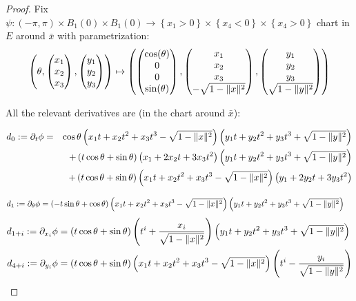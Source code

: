 \documentclass[9pt]{article}
\begin{document}
\begin{proof}
  Fix $\psi: \left(-\pi, \pi \right)\times B_1(0) \times B_1(0)\rightarrow \left\{ x_1 > 0\right\}\times \left\{ x_4 <0\right\}\times \left\{ x_4 >0\right\}$ chart in $E$ around $\bar{x}$ with parametrization:
  \[
    \left(\theta, \begin{pmatrix}x_1\\ x_2 \\ x_3\end{pmatrix},\begin{pmatrix}y_1\\y_2\\y_3\end{pmatrix}\right) \mapsto \left(\begin{pmatrix}\cos(\theta)\\ 0\\ 0\\ \sin(\theta)\end{pmatrix}, \begin{pmatrix}x_1\\ x_2 \\ x_3\\-\sqrt{1-\lVert x \rVert^2}\end{pmatrix},\begin{pmatrix}y_1\\y_2\\y_3\\\sqrt{1-\lVert y \rVert^2}\end{pmatrix}\right)
  \]


  All the relevant derivatives are (in the chart around $\bar x$):

  \begin{align*}
    d_0:=\partial_t\phi &=& \cos\theta\left(x_1t + x_2t^2 + x_3t^3 - \sqrt{1-\lVert x \rVert^2}\right)\left(y_1t + y_2t^2 + y_3t^3+\sqrt{1-\lVert y \rVert^2}\right)\\
                   & &+ \left(t\cos\theta +\sin\theta\right)\left( x_1+ 2x_2t + 3x_3t^2\right)\left(y_1t + y_2t^2 + y_3t^3+\sqrt{1-\lVert y \rVert^2}\right)\\
                   & &+ \left(t\cos\theta +\sin\theta\right)\left(x_1t + x_2t^2 + x_3t^3 - \sqrt{1-\lVert x \rVert^2}\right)\left( y_1+ 2y_2t + 3y_3t^2\right)
  \end{align*}

  \begin{align*}
    d_1:=\partial_\theta \phi &= \left(-t\sin\theta +\cos\theta\right)\left(x_1t + x_2t^2 + x_3t^3 - \sqrt{1-\lVert x \rVert^2}\right)\left(y_1t + y_2t^2 + y_3t^3+\sqrt{1-\lVert y \rVert^2}\right)
  \end{align*}
  \begin{align*}
    d_{1+i}:=\partial_{x_i} \phi &= \left(t\cos\theta +\sin\theta\right)\left( t^i + \frac{x_i}{\sqrt{1-\lVert x \rVert^2}}\right)\left(y_1t + y_2t^2 + y_3t^3+\sqrt{1-\lVert y \rVert^2}\right)\\
    d_{4+i}:=\partial_{y_i} \phi &= \left(t\cos\theta +\sin\theta\right)\left(x_1t + x_2t^2 + x_3t^3 - \sqrt{1-\lVert x \rVert^2}\right)\left( t^i - \frac{y_i}{\sqrt{1-\lVert y \rVert^2}} \right)
  \end{align*}


\end{proof}
\end{document}
